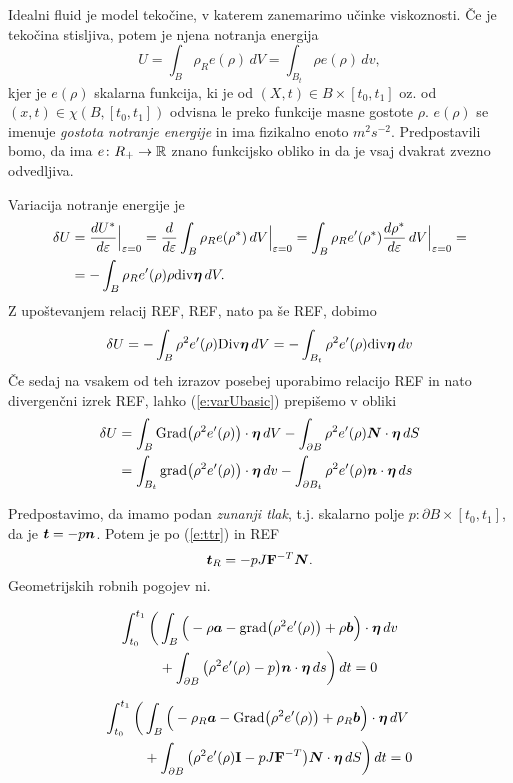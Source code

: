 Idealni fluid je model tekočine, v katerem zanemarimo učinke viskoznosti. Če je tekočina
stisljiva, potem je njena notranja energija
\[ U=\int_{B}\rho_R e(\rho)\,dV=\int_{B_t}\rho e(\rho)\,dv, \]
kjer je $e(\rho)$ skalarna funkcija, ki je od $(X,t)\in B\times[t_0,t_1]$ oz. od
$(x,t)\in\chi(B,[t_0,t_1])$ odvisna le preko funkcije masne gostote $\rho$. $e(\rho)$
se imenuje \emph{gostota notranje energije} in ima fizikalno enoto $m^2s^{-2}$.
Predpostavili bomo, da ima $e\colon R_+\to\mathbb R$ znano funkcijsko obliko in da je
vsaj dvakrat zvezno odvedljiva.

Variacija notranje energije je
\begin{align*} 
	\delta U &=\frac{dU^*}{d\varepsilon}\Big|_{\varepsilon=0}=\frac{d}{d\varepsilon}
	\int_{B}\rho_R e(\rho^*)\,dV \Big|_{\varepsilon=0} =
	\int_{B}\rho_R e'(\rho^*)\frac{d\rho^*}{d\varepsilon}\,dV \Big|_{\varepsilon=0} = \\
	&= -\int_{B}\rho_R e'(\rho)\rho\mathrm{div}\boldsymbol \eta\,dV.
\end{align*}
Z upoštevanjem relacij REF, REF, nato pa še REF, dobimo
\begin{equation}\label{e:varUbasic}
	\delta U = -\int_{B}\rho^2e'(\rho)\mathrm {Div}\boldsymbol \eta\,dV = -\int_{B_t}\rho^2 e'(\rho)\mathrm{div}\boldsymbol \eta\,dv
\end{equation}
Če sedaj na vsakem od teh izrazov posebej uporabimo relacijo REF in nato divergenčni izrek REF,
lahko (\ref{e:varUbasic}) prepišemo v obliki
\begin{align*}
	\delta U &= \int_{B}\mathrm{Grad}\big(\rho^2 e'(\rho)\big)\cdot\boldsymbol \eta\,dV
	-\int_{\partial B}\rho^2 e'(\rho)\boldsymbol N\cdot\boldsymbol \eta\,dS \\
	&= \int_{B_t}\mathrm{grad}\big(\rho^2 e'(\rho)\big)\cdot\boldsymbol \eta\,dv
	-\int_{\partial B_t}\rho^2 e'(\rho)\boldsymbol n\cdot\boldsymbol \eta\,ds
\end{align*}

Predpostavimo, da imamo podan \emph{zunanji tlak}, t.j. skalarno polje $p\colon\partial B\times[t_0,t_1]$,
da je $\boldsymbol t=-p\boldsymbol n$. Potem je po (\ref{e:ttr}) in REF
\[ \boldsymbol t_R=-pJ\mathbf F^{-T}\boldsymbol N. \]
Geometrijskih robnih pogojev ni.

\begin{align*}
	\int_{t_0}^{t_1}\bigg( &\int_{B}\Big(-\rho\boldsymbol a-\mathrm{grad}\big(\rho^2 e'(\rho)\big)+\rho\boldsymbol b\Big)\cdot\boldsymbol \eta\,dv \\
	&+\int_{\partial B}\big(\rho^2 e'(\rho)-p\big)\boldsymbol n\cdot\boldsymbol \eta\,ds\bigg)\,dt=0
\end{align*}

\begin{align*}
	\int_{t_0}^{t_1}\bigg( &\int_{B}\Big(-\rho_R\boldsymbol a-\mathrm{Grad}\big(\rho^2 e'(\rho)\big)+\rho_R\boldsymbol b\Big)\cdot\boldsymbol \eta\,dV \\
	&+\int_{\partial B}\big(\rho^2 e'(\rho)\mathbf I-pJ\mathbf F^{-T}\big)\boldsymbol N\cdot\boldsymbol \eta\,dS\bigg)\,dt=0
\end{align*}